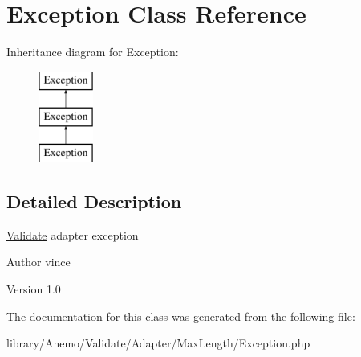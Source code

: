 \hypertarget{class_anemo_1_1_validate_1_1_adapter_1_1_max_length_1_1_exception}{
\section{Exception Class Reference}
\label{class_anemo_1_1_validate_1_1_adapter_1_1_max_length_1_1_exception}
}
Inheritance diagram for Exception:\begin{figure}[H]
\begin{center}
\leavevmode
\includegraphics[height=3.000000cm]{class_anemo_1_1_validate_1_1_adapter_1_1_max_length_1_1_exception}
\end{center}
\end{figure}


\subsection{Detailed Description}
\hyperlink{class_anemo_1_1_validate}{Validate} adapter exception \begin{DoxyAuthor}{Author}
vince 
\end{DoxyAuthor}
\begin{DoxyVersion}{Version}
1.0 
\end{DoxyVersion}


The documentation for this class was generated from the following file:\begin{DoxyCompactItemize}
\item 
library/Anemo/Validate/Adapter/MaxLength/Exception.php\end{DoxyCompactItemize}
